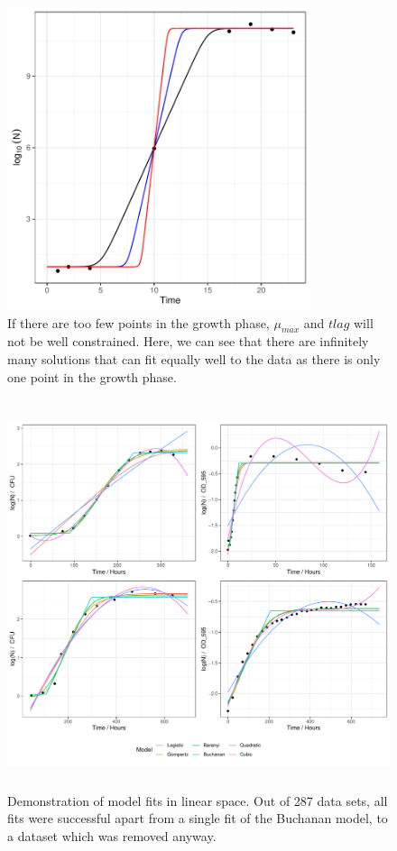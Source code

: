 \documentclass[11pt, a4paper]{article}
\begin{document}
                 \begin{figure}[H]
        \includegraphics[width=3.5in]{../results/constraint_demo.pdf}
        \centering
        \caption{If there are too few points in the growth phase, $\mu_{max}$ and $t{lag}$ will not be well constrained. Here, we can see that there are infinitely many solutions that can fit equally well to the data as there is only one point in the growth phase. }
        \label{sup:constraint}
        \end{figure}  


                \begin{figure}[H]
                \centering
        \includegraphics[height=4.5in]{../results/model_fits_linear.pdf}
        \caption{Demonstration of model fits in linear space. Out of 287 data sets, all fits were successful apart from a single fit of the Buchanan model, to a dataset which was removed anyway.}
        \label{sup:model_fits_linear}
        \end{figure}
\end{document}

